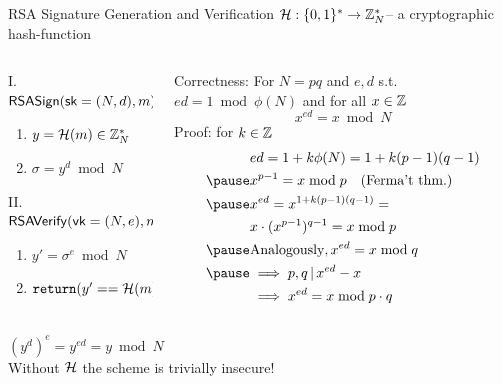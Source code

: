 \documentclass[usenames,dvipsnames, 9pt]{beamer}
\begin{document}
\begin{frame}{RSA Signature Generation and Verification}
\large
$\mathcal{H}: \{0,1\}^\ast \rightarrow {{\mathbb Z}}_N^\ast$-- a cryptographic hash-function
\vspace{10pt}
\begin{columns}[t]
	\begin{column}{0.45\textwidth}
		
{\color{Orange} I. $\mathsf{RSASign}(\textsf{sk}=(N, d), m):$}
\begin{enumerate}
	\itemsep5pt
	\item $y = \mathcal{H}(m) \in {{\mathbb Z}}_N^\ast$
	\item $\sigma = y^d \bmod N$
\end{enumerate}
\vspace{10pt}
\pause
{\color{Orange} II. $\mathsf{RSAVerify}(\textsf{vk}=(N, e), m, \sigma):$}
\begin{enumerate}
	\itemsep5pt
	\item $y' = \sigma^e \bmod N$
	\item $\mathtt{return}(y'==\mathcal{H}(m))$ \\
\end{enumerate}
	\end{column}
	\begin{column}{0.55\textwidth}
		\pause
		{\color{Orange} Correctness:}
		For $N=pq$ and $e,d$ s.t.\ $ed = 1 \bmod \phi(N)$ and for all $x \in {{\mathbb Z}}$
		{\color{Orange} 
		\[
			x^{ed} = x \bmod N
		\] }
	\pause
		Proof: for $k \in {{\mathbb Z}}$
		\begin{align*}
		&ed = 1 + k \phi(N) = 1+k(p-1)(q-1) \\  \pause
		& x^{p-1} = x \bmod p \quad \text{(Ferma't thm.)}\\ \pause
		& x^{ed} = x^{1+k(p-1)(q-1)} = \\
		& x \cdot (x^{p-1})^{q-1} = x \bmod p \\ \pause
		&\text{Analogously}, x^{ed}  = x \bmod q \\ \pause
		& \implies  p, q \, |\, x^{ed} - x \\
		& \implies   x^{ed} = x \bmod p \cdot q
		\end{align*}
	\end{column}
\end{columns}
\LARGE
\vspace*{-40pt}
{\color{Orange}  $(y^d)^e = y^{ed} = y \bmod N$ } \\[20pt]

\centering
\vfill
Without $\mathcal{H}$ the scheme is trivially insecure!
\end{frame}
\end{document}
